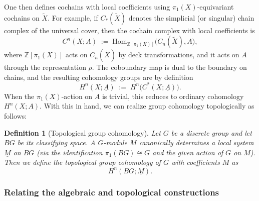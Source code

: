 \documentclass[aps,prx,reprint,superscriptaddress,twocolumn,amsmath,amssymb,amsfonts, nofootinbib]{revtex4-2}
\theoremstyle{apsstyle}
\newtheorem{definition}[theorem]{Definition}
\begin{document}
One then defines cochains with local coefficients using $\pi_1(X)$-equivariant cochains on $\widetilde{X}$. For example, if $C_\ast(\widetilde{X})$ denotes the simplicial (or singular) chain
complex of the universal cover, then the cochain complex with local coefficients is
\begin{equation}
    C^n(X;\underline{A})
    \;:=\;
    \mathrm{Hom}_{\mathbb{Z}[\pi_1(X)]}\big(C_n(\widetilde{X}),A\big),
\end{equation}
where $\mathbb{Z}[\pi_1(X)]$ acts on $C_n(\widetilde{X})$ by deck transformations, and it acts on $A$ through the representation $\rho$. The coboundary map is dual to the boundary on chains,
and the resulting cohomology groups are by definition
\begin{equation}
    H^n(X;\underline{A}) \;:=\; H^n\big(C^\ast(X;\underline{A})\big).
\end{equation}
When the $\pi_1(X)$-action on $A$ is trivial, this reduces to ordinary cohomology $H^n(X;A)$. With this in hand, we can realize group cohomology topologically as follows:

\bigskip 

\begin{definition}[Topological group cohomology]
    Let $G$ be a discrete group and let $BG$ be its classifying space.
A $G$-module $M$ canonically determines a local system $\underline{M}$ on $BG$ (via the identification $\pi_1(BG)\cong G$ and the given action of $G$ on $M$). Then we define the topological group cohomology of $G$ with coefficients $M$ as
\begin{equation}
    H^n(BG;\underline{M}).
\end{equation}
\end{definition}


\subsubsection{Relating the algebraic and topological constructions}
\label{app:grpcoh_relation}
\end{document}
